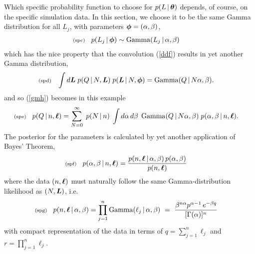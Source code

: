\documentclass[11pt]{article}
\newcommand{\lleq}[1]{\label{#1} }
\renewcommand{\lleq}[1]{\label{#1} {\scriptstyle {\rm (#1)}} \hspace*{2ex} }
\newcommand{\cond}{\,|\,}
\DeclareMathOperator{\GammaDist}{Gamma}
\begin{document}
Which specific probability function to choose for $p(L\cond\bmtheta)$
depends, of course, on the specific simulation data. In this section,
we choose it to be the same Gamma distribution for all $L_j$,
with parameters ${\bm{\phi}} = (\alpha,\beta)$,
\begin{align}
  \lleq{spc}
  p(L_j\cond \bmphi) &\sim \GammaDist(L_j\cond \alpha,\beta)
\end{align}
which has the nice property that the convolution (\ref{ddf}) results
in yet another Gamma distribution,
\begin{align}
  \lleq{spd}
  \int d\bmL\; p(Q\cond N,\bmL)\; p(\bmL\cond N,\bmphi)
  &= \GammaDist(Q\cond N\alpha, \beta).
\end{align}
and so (\ref{gmh}) becomes in this example
\begin{align}
  \lleq{spe}
  p(Q\cond n,\bml)
  &= \sum_{N=0}^\infty \;
    p(N\cond n)\;
    \int d\alpha\,d\beta\;
    \GammaDist(Q\cond N\alpha, \beta)\;
    p(\alpha,\beta\cond n,\bml).
\end{align}
The posterior for the parameters is calculated by yet another 
application of Bayes' Theorem,
\begin{align}
  \lleq{spf}
  p(\alpha,\beta\cond n,\bml)
  &= \frac{p(n,\bml\cond \alpha,\beta)\,p(\alpha,\beta)}{p(n,\bml)}
\end{align}
where the data $(n,{\bm{\ell}})$ must naturally follow the same
Gamma-distribution likelihood as $(N,{\bm{L}})$, i.e.\
\begin{align}
  \lleq{spg}
  p(n,\bml\cond \alpha,\beta) 
  & = \prod_{j=1}^n \GammaDist(\ell_j\cond\alpha,\beta)
    \ =\ \frac{\beta^{n\alpha} p^{\alpha-1}\,e^{-\beta q}}{[\Gamma(\alpha)]^n}
\end{align}
with compact representation of the data in terms of
$q = \sum_{j=1}^n \ell_j$ and $r = \prod_{j=1}^n \ell_j$.
\end{document}
